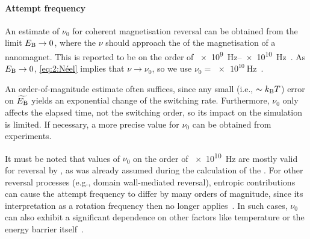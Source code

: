 \paragraph{Attempt frequency}
An estimate of $\nu_0$ for coherent magnetisation reversal can be obtained from the limit $E_\mathrm{B} \rightarrow 0$, where the  $\nu$ should approach the  of the magnetisation of a nanomagnet.
This is reported to be on the order of \SIrange{e9}{e10}{\hertz}~\cite{BrownThermalFluctuations,bean1959superparamagnetism}.
As $E_\mathrm{B} \rightarrow 0$, \cref{eq:2:Néel} implies that $\nu \rightarrow \nu_0$, so we use $\nu_0=\SI{e10}{\hertz}$~\cite{JM_Masterproef}. \par %
An order-of-magnitude estimate often suffices, since any small (i.e., $\sim \kBT$) error on $\widetilde{E_\mathrm{B}}$ yields an exponential change of the switching rate.
Furthermore, $\nu_0$ only affects the elapsed time, not the switching order, so its impact on the simulation is limited.
If necessary, a more precise value for $\nu_0$ can be obtained from experiments. \par
It must be noted that values of $\nu_0$ on the order of \SI{e10}{\hertz} are mostly valid for reversal by , as was already assumed during the calculation of the .
For other reversal processes (e.g., domain wall-mediated reversal), entropic contributions can cause the attempt frequency to differ by many orders of magnitude, since its interpretation as a rotation frequency then no longer applies~\cite{ArrheniusPrefactor,RetentionTimeMeyerNeldel}.
In such cases, $\nu_0$ can also exhibit a significant dependence on other factors like temperature or the energy barrier itself~\cite{AttemptFreqTemperature,RetentionTimeMeyerNeldel}. %


